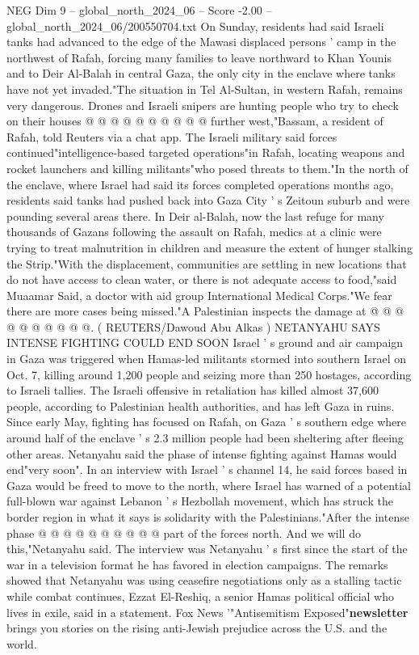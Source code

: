 \begin{textsample}{NEG Dim 9 – global\_north\_2024\_06 – Score -2.00 – global\_north\_2024\_06/200550704.txt}
On Sunday, residents had said Israeli tanks had advanced to the edge of the Mawasi displaced persons ' camp in the northwest of Rafah, forcing many families to leave northward to Khan Younis and to Deir Al-Balah in central Gaza, the only city in the enclave where tanks have not yet invaded."The situation in Tel Al-Sultan, in western Rafah, remains very dangerous.
Drones and Israeli snipers are hunting people who try to check on their houses @ @ @ @ @ @ @ @ @ @ further west,"Bassam, a resident of Rafah, told Reuters via a chat app.
The Israeli military said forces continued"intelligence-based targeted operations"in Rafah, locating weapons and rocket launchers and killing militants"who posed threats to them."In the north of the enclave, where Israel had said its forces completed operations months ago, residents said tanks had pushed back into Gaza City ' s Zeitoun suburb and were pounding several areas there.
In Deir al-Balah, now the last refuge for many thousands of Gazans following the assault on Rafah, medics at a clinic were trying to treat malnutrition in children and measure the extent of hunger stalking the Strip."With the displacement, communities are settling in new locations that do not have access to clean water, or there is not adequate access to food,"said Muaamar Said, a doctor with aid group International Medical Corps."We fear there are more cases being missed."A Palestinian inspects the damage at @ @ @ @ @ @ @ @ @ @. ( REUTERS/Dawoud Abu Alkas ) NETANYAHU SAYS INTENSE FIGHTING COULD END SOON Israel ' s ground and air campaign in Gaza was triggered when Hamas-led militants stormed into southern Israel on Oct. 7, killing around 1,200 people and seizing more than 250 hostages, according to Israeli tallies.
The Israeli offensive in retaliation has killed almost 37,600 people, according to Palestinian health authorities, and has left Gaza in ruins.
Since early May, fighting has focused on Rafah, on Gaza ' s southern edge where around half of the enclave ' s 2.3 million people had been sheltering after fleeing other areas.
Netanyahu said the phase of intense fighting against Hamas would end"very soon".
In an interview with Israel ' s channel 14, he said forces based in Gaza would be freed to move to the north, where Israel has warned of a potential full-blown war against Lebanon ' s Hezbollah movement, which has struck the border region in what it says is solidarity with the Palestinians."After the intense phase @ @ @ @ @ @ @ @ @ @ part of the forces north.
And we will do this,"Netanyahu said.
The interview was Netanyahu ' s first since the start of the war in a television format he has favored in election campaigns.
The remarks showed that Netanyahu was using ceasefire negotiations only as a stalling tactic while combat continues, Ezzat El-Reshiq, a senior Hamas political official who lives in exile, said in a statement.
Fox News '"Antisemitism Exposed"\textbf{newsletter} brings you stories on the rising anti-Jewish prejudice across the U.S. and the world.

\end{textsample}
